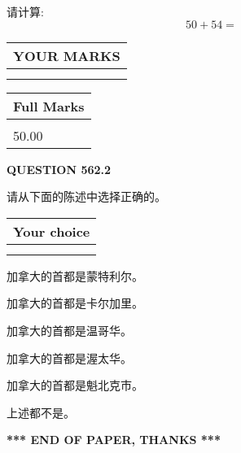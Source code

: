 \documentclass{ctexart}
\begin{document}
  
 
请计算:
\begin{equation}
50 +  %
54 = \nonumber
\end{equation}
 

 

 
  
\vspace{0.2in}
  
\noindent\begin{tabular}{|l|}
\hline
 YOUR MARKS  \\
\hline
 \\ 
 \\ 
\hline
\end{tabular}
\hspace{0.05in} \begin{tabular}{|l|}
\hline
 Full Marks  \\
\hline
 \\ 
50.00 \\
\hline
\end{tabular}
{\textbf{\Large{QUESTION
562.2 
}}}
  
  
请从下面的陈述中选择正确的。
  
  
\noindent\hspace{3.0in} \begin{tabular}{|l|}
\hline
Your choice \\
\hline
 \\ 
 \\ 
\hline
\end{tabular}
  
  
 
 
加拿大的首都是蒙特利尔。
 
 
加拿大的首都是卡尔加里。
 
 
加拿大的首都是温哥华。
 
 
加拿大的首都是渥太华。
 
 
加拿大的首都是魁北克市。
 
 
 上述都不是。
 
 
   
   
 \vspace{0.2in}
 
   
   
   
   
\vspace{1.0in} 
{\textbf{\large{ *** END OF PAPER, THANKS *** }}} 
   
\end{document}
